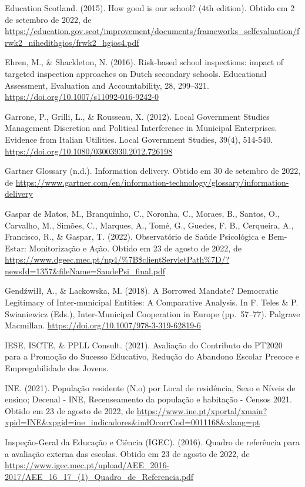 \documentclass[
]{book}
\begin{document}
Education Scotland. (2015). How good is our school? (4th edition). Obtido em 2 de setembro de 2022, de \url{https://education.gov.scot/improvement/documents/frameworks_selfevaluation/frwk2_nihedithgios/frwk2_hgios4.pdf}

Ehren, M., \& Shackleton, N. (2016). Risk-based school inspections: impact of targeted inspection approaches on Dutch secondary schools. Educational Assessment, Evaluation and Accountability, 28, 299--321. \url{https://doi.org/10.1007/s11092-016-9242-0}

Garrone, P., Grilli, L., \& Rousseau, X. (2012). Local Government Studies Management Discretion and Political Interference in Municipal Enterprises. Evidence from Italian Utilities. Local Government Studies, 39(4), 514-540. \url{https://doi.org/10.1080/03003930.2012.726198}

Gartner Glossary (n.d.). Information delivery. Obtido em 30 de setembro de 2022, de \url{https://www.gartner.com/en/information-technology/glossary/information-delivery}

Gaspar de Matos, M., Branquinho, C., Noronha, C., Moraes, B., Santos, O., Carvalho, M., Simões, C., Marques, A., Tomé, G., Guedes, F. B., Cerqueira, A., Francisco, R., \& Gaspar, T. (2022). Observatório de Saúde Psicológica e Bem-Estar: Monitorização e Ação. Obtido em 23 de agosto de 2022, de \url{https://www.dgeec.mec.pt/np4/\%7B$clientServletPath\%7D/?newsId=1357\&fileName=SaudePsi_final.pdf}

Gendźwiłł, A., \& Lackowska, M. (2018). A Borrowed Mandate? Democratic Legitimacy of Inter-municipal Entities: A Comparative Analysis. In F. Teles \& P. Swianiewicz (Eds.), Inter-Municipal Cooperation in Europe (pp.~57--77). Palgrave Macmillan. \url{https://doi.org/10.1007/978-3-319-62819-6}

IESE, ISCTE, \& PPLL Consult. (2021). Avaliação do Contributo do PT2020 para a Promoção do Sucesso Educativo, Redução do Abandono Escolar Precoce e Empregabilidade dos Jovens.

INE. (2021). População residente (N.o) por Local de residência, Sexo e Níveis de ensino; Decenal - INE, Recenseamento da população e habitação - Censos 2021. Obtido em 23 de agosto de 2022, de \url{https://www.ine.pt/xportal/xmain?xpid=INE\&xpgid=ine_indicadores\&indOcorrCod=0011168\&xlang=pt}

Inspeção-Geral da Educação e Ciência (IGEC). (2016). Quadro de referência para a avaliação externa das escolas. Obtido em 23 de agosto de 2022, de \url{https://www.igec.mec.pt/upload/AEE_2016-2017/AEE_16_17_(1)_Quadro_de_Referencia.pdf}
\end{document}
